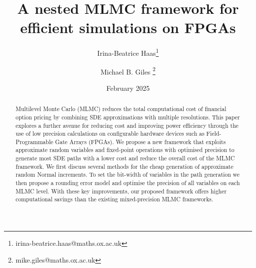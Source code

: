 \documentclass[a4paper]{article}
\title{A nested MLMC framework for efficient simulations on FPGAs}
\author{Irina-Beatrice Haas\thanks{irina-beatrice.haas@maths.ox.ac.uk} \and Michael B. Giles \thanks{mike.giles@maths.ox.ac.uk}}
\date{February 2025}
\begin{document}
\maketitle

\begin{abstract}
    Multilevel Monte Carlo (MLMC) reduces the total computational cost of financial option pricing by combining SDE approximations with multiple resolutions. This paper explores a further avenue for reducing cost and improving power efficiency through the use of low precision calculations on configurable hardware devices such as Field-Programmable Gate Arrays (FPGAs). We propose a new framework that exploits approximate random variables and fixed-point operations with optimised precision to generate most SDE paths with a lower cost and reduce the overall cost of the MLMC framework. We first discuss several methods for the cheap generation of approximate random Normal increments. To set the bit-width of variables in the path generation we then propose a rounding error model and optimise the precision of all variables on each MLMC level. With these key improvements, our proposed framework offers higher computational savings than the existing mixed-precision MLMC frameworks.
\end{abstract}












\end{document}
